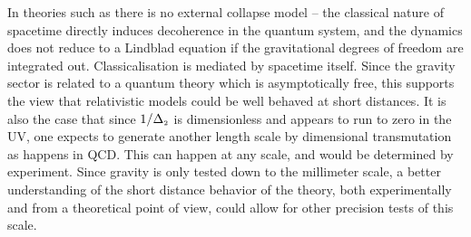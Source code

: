 \documentclass[aps,preprintnumbers,superscriptaddress,longbibliography]{revtex4-1}
\def\R2Term{\Delta_{\text{\tiny 2}}}
\def\WeylTerm{\Delta_{\text{\tiny w}}}
\begin{document}
 In theories such as \cite{oppenheim2018post,oppenheim2023covariant} there is no external collapse model -- the classical nature of spacetime directly induces decoherence in the quantum system, and the dynamics does not reduce to a Lindblad equation if the gravitational degrees of freedom are integrated out. Classicalisation is mediated by spacetime itself. 
Since the gravity sector is related to a quantum theory which is asymptotically free, this supports the view that relativistic models could be well behaved at short distances. %
It is also the case that since $1/\R2Term$ is dimensionless and appears to  run to zero in the UV, one expects to generate another length scale by dimensional transmutation as happens in QCD. This can happen at any scale, and would be determined by experiment. Since gravity is only tested down to the millimeter scale, a better understanding of the short distance behavior of the theory, both experimentally and from a theoretical point of view, could allow for other precision tests of this scale.





\end{document}

